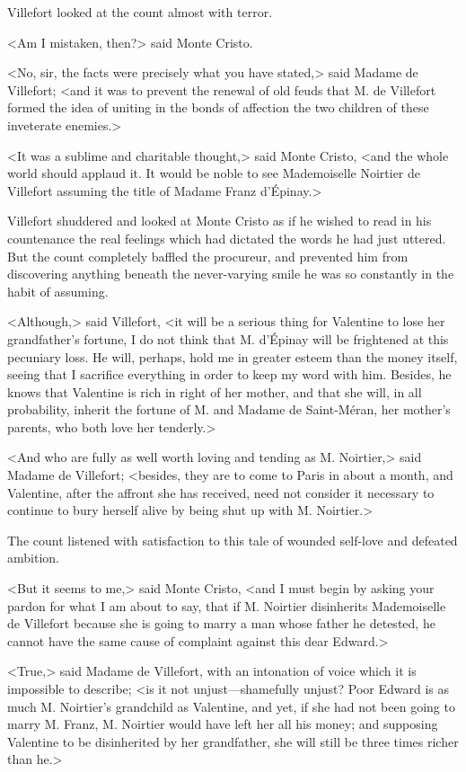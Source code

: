  Villefort looked at the count almost with terror. 

 <Am I mistaken, then?> said Monte Cristo. 

 <No, sir, the facts were precisely what you have stated,> said Madame de Villefort; <and it was to prevent the renewal of old feuds that M. de Villefort formed the idea of uniting in the bonds of affection the two children of these inveterate enemies.> 

 <It was a sublime and charitable thought,> said Monte Cristo, <and the whole world should applaud it. It would be noble to see Mademoiselle Noirtier de Villefort assuming the title of Madame Franz d'Épinay.> 

 Villefort shuddered and looked at Monte Cristo as if he wished to read in his countenance the real feelings which had dictated the words he had just uttered. But the count completely baffled the procureur, and prevented him from discovering anything beneath the never-varying smile he was so constantly in the habit of assuming. 

 <Although,> said Villefort, <it will be a serious thing for Valentine to lose her grandfather's fortune, I do not think that M. d'Épinay will be frightened at this pecuniary loss. He will, perhaps, hold me in greater esteem than the money itself, seeing that I sacrifice everything in order to keep my word with him. Besides, he knows that Valentine is rich in right of her mother, and that she will, in all probability, inherit the fortune of M. and Madame de Saint-Méran, her mother's parents, who both love her tenderly.> 

 <And who are fully as well worth loving and tending as M. Noirtier,> said Madame de Villefort; <besides, they are to come to Paris in about a month, and Valentine, after the affront she has received, need not consider it necessary to continue to bury herself alive by being shut up with M. Noirtier.> 

 The count listened with satisfaction to this tale of wounded self-love and defeated ambition. 

 <But it seems to me,> said Monte Cristo, <and I must begin by asking your pardon for what I am about to say, that if M. Noirtier disinherits Mademoiselle de Villefort because she is going to marry a man whose father he detested, he cannot have the same cause of complaint against this dear Edward.> 

 <True,> said Madame de Villefort, with an intonation of voice which it is impossible to describe; <is it not unjust—shamefully unjust? Poor Edward is as much M. Noirtier's grandchild as Valentine, and yet, if she had not been going to marry M. Franz, M. Noirtier would have left her all his money; and supposing Valentine to be disinherited by her grandfather, she will still be three times richer than he.> 

